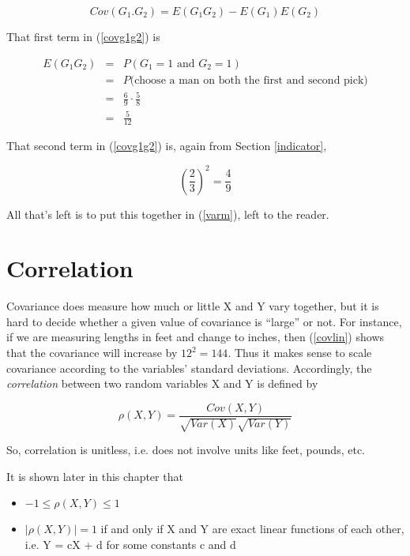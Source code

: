 \begin{equation}
\label{covg1g2}
Cov(G_1.G_2) = E(G_1 G_2) - E(G_1) E(G_2)
\end{equation}

That first term in (\ref{covg1g2}) is 

\begin{eqnarray}
E(G_1 G_2) &=& P(G_1 = 1 \textrm{ and } G_2 = 1) \\ 
&=& P(\textrm{choose a man on both the first and second pick)} \\
&=& \frac{6}{9} \cdot \frac{5}{8} \\
&=& \frac{5}{12} 
\end{eqnarray}

That second term in (\ref{covg1g2}) is, again from Section
\ref{indicator},

\begin{equation}
\left (
\frac{2}{3}
\right )^2 = \frac{4}{9}
\end{equation}

All that's left is to put this together in (\ref{varm}), left to the
reader.

\section{Correlation}
\label{correlation}

Covariance does measure how much or little X and Y vary together, but it
is hard to decide whether a given value of covariance is ``large'' or
not.  For instance, if we are measuring lengths in feet and change to
inches, then (\ref{covlin}) shows that the covariance will increase by
$12^2 = 144$.  Thus it makes sense to scale covariance according to the
variables' standard deviations.  Accordingly, the {\it correlation}
between two random variables X and Y is defined by

\begin{equation}
\label{rhodef}
\rho(X,Y) = \frac{Cov(X,Y)}
{\sqrt{Var(X)} \sqrt{Var(Y)}}
\end{equation}

So, correlation is unitless, i.e. does not involve units like feet,
pounds, etc.

It is shown later in this chapter that 

\begin{itemize}

\item $-1 \leq \rho(X,Y) \leq 1$

\item  $|\rho(X,Y)| = 1$ if and only if X and Y are exact linear functions
of each other, i.e. Y = cX + d for some constants c and d
\end{itemize}

